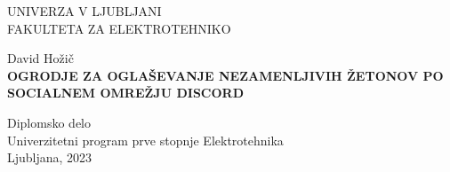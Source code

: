 \begin{titlepage}
    \thispagestyle{empty} 
    \begin{center}
    {\large 
    UNIVERZA V LJUBLJANI\\
    FAKULTETA ZA ELEKTROTEHNIKO\\
    }

    \vspace{3cm}
    {\LARGE David Hožič}\\

    \vspace{2cm}
    {\textbf{\LARGE OGRODJE ZA OGLAŠEVANJE NEZAMENLJIVIH ŽETONOV PO SOCIALNEM OMREŽJU DISCORD }}

    \vspace{2cm}
    {\Large Diplomsko delo}\\
    
    \vspace{1cm}
    {\Large Univerzitetni program prve stopnje Elektrotehnika}\\

    \vspace{2cm}
    \vfill
    {\Large Ljubljana, 2023}
    \end{center}
    \ \thispagestyle{empty}

\end{titlepage}



